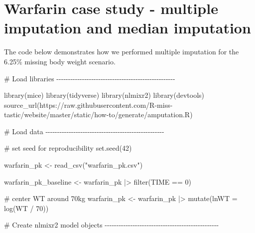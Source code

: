 \documentclass[
]{article}
\newenvironment{Shaded}{}{}
\newcommand{\AttributeTok}[1]{\textcolor[rgb]{0.84,0.23,0.29}{#1}}
\newcommand{\CommentTok}[1]{\textcolor[rgb]{0.42,0.45,0.49}{#1}}
\newcommand{\DecValTok}[1]{\textcolor[rgb]{0.00,0.36,0.77}{#1}}
\newcommand{\FunctionTok}[1]{\textcolor[rgb]{0.44,0.26,0.76}{#1}}
\newcommand{\NormalTok}[1]{\textcolor[rgb]{0.14,0.16,0.18}{#1}}
\newcommand{\OtherTok}[1]{\textcolor[rgb]{0.44,0.26,0.76}{#1}}
\newcommand{\SpecialCharTok}[1]{\textcolor[rgb]{0.00,0.36,0.77}{#1}}
\newcommand{\StringTok}[1]{\textcolor[rgb]{0.01,0.18,0.38}{#1}}
\begin{document}
\section{Warfarin case study - multiple imputation and median
imputation}\label{warfarin-case-study---multiple-imputation-and-median-imputation}

The code below demonstrates how we performed multiple imputation for the
6.25\% missing body weight scenario.

\begin{Shaded}
\begin{Highlighting}[]
\CommentTok{\# Load libraries {-}{-}{-}{-}{-}{-}{-}{-}{-}{-}{-}{-}{-}{-}{-}{-}{-}{-}{-}{-}{-}{-}{-}{-}{-}{-}{-}{-}{-}{-}{-}{-}{-}{-}{-}{-}{-}{-}{-}{-}{-}{-}{-}{-}{-}{-}{-}{-}{-}{-}{-}}

\FunctionTok{library}\NormalTok{(mice)}
\FunctionTok{library}\NormalTok{(tidyverse)}
\FunctionTok{library}\NormalTok{(nlmixr2)}
\FunctionTok{library}\NormalTok{(devtools)}
\FunctionTok{source\_url}\NormalTok{(}\StringTok{\textquotesingle{}https://raw.githubusercontent.com/R{-}miss{-}tastic/website/master/static/how{-}to/generate/amputation.R\textquotesingle{}}\NormalTok{)}

\CommentTok{\# Load data {-}{-}{-}{-}{-}{-}{-}{-}{-}{-}{-}{-}{-}{-}{-}{-}{-}{-}{-}{-}{-}{-}{-}{-}{-}{-}{-}{-}{-}{-}{-}{-}{-}{-}{-}{-}{-}{-}{-}{-}{-}{-}{-}{-}{-}{-}{-}{-}{-}{-}{-}}

\CommentTok{\# set seed for reproducibility}
\FunctionTok{set.seed}\NormalTok{(}\DecValTok{42}\NormalTok{)}

\NormalTok{warfarin\_pk }\OtherTok{\textless{}{-}} \FunctionTok{read\_csv}\NormalTok{(}\StringTok{"warfarin\_pk.csv"}\NormalTok{)}

\NormalTok{warfarin\_pk\_baseline }\OtherTok{\textless{}{-}}\NormalTok{ warfarin\_pk }\SpecialCharTok{|\textgreater{}} \FunctionTok{filter}\NormalTok{(TIME }\SpecialCharTok{==} \DecValTok{0}\NormalTok{)}

\CommentTok{\# center WT around 70kg}
\NormalTok{warfarin\_pk }\OtherTok{\textless{}{-}}\NormalTok{ warfarin\_pk }\SpecialCharTok{|\textgreater{}} 
  \FunctionTok{mutate}\NormalTok{(}\AttributeTok{lnWT =} \FunctionTok{log}\NormalTok{(WT }\SpecialCharTok{/} \DecValTok{70}\NormalTok{))}

\CommentTok{\# Create nlmixr2 model objects {-}{-}{-}{-}{-}{-}{-}{-}{-}{-}{-}{-}{-}{-}{-}{-}{-}{-}{-}{-}{-}{-}{-}{-}{-}{-}{-}{-}{-}{-}{-}{-}{-}{-}{-}{-}{-}{-}{-}{-}{-}{-}{-}{-}{-}{-}{-}{-}{-}}


\end{Highlighting}
\end{Shaded}
\end{document}
